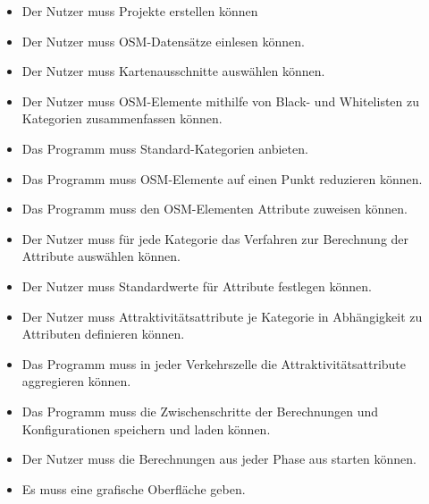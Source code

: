 \documentclass[parskip=full]{scrartcl} %
\begin{document}
\begin{itemize}
    \item <MK1> Der Nutzer muss Projekte erstellen können
    \item <MK2> Der Nutzer muss OSM-Datensätze einlesen können.
    \item <MK3> Der Nutzer muss Kartenausschnitte auswählen können.
    \item <MK4> Der Nutzer muss OSM-Elemente mithilfe von Black- und Whitelisten zu Kategorien zusammenfassen können.
    \item <MK5> Das Programm muss Standard-Kategorien anbieten.
    \item <MK6>Das Programm muss OSM-Elemente auf einen Punkt reduzieren können.
    \item <MK7> Das Programm muss den OSM-Elementen Attribute zuweisen können.
    \item <MK8> Der Nutzer muss für jede Kategorie das Verfahren zur Berechnung der Attribute auswählen können.
    \item <MK9> Der Nutzer muss Standardwerte für Attribute festlegen können.
    \item <MK10> Der Nutzer muss Attraktivitätsattribute je Kategorie in Abhängigkeit zu Attributen definieren können.
    \item <MK11> Das Programm muss in jeder Verkehrszelle die Attraktivitätsattribute aggregieren können.
    \item <MK12> Das Programm muss die Zwischenschritte der Berechnungen und Konfigurationen speichern und laden können.
    \item <MK13> Der Nutzer muss die Berechnungen aus jeder Phase aus starten können.
    \item <MK14> Es muss eine grafische Oberfläche geben.
\end{itemize}
\end{document}

